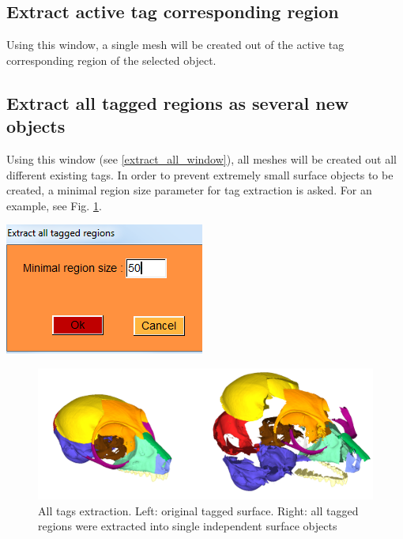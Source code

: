 \subsection{Extract active tag corresponding region}
Using this window, a single mesh will be created out of the active tag corresponding region of the
selected object. 

\subsection{Extract all tagged regions as several new objects}
\noindent
\begin{minipage}{0.5\textwidth}
Using this window (see \ref{extract_all_window}), all meshes will be created out all different existing tags. In order to prevent extremely small surface objects to be created, a minimal region size parameter for tag extraction is asked. For an example, see Fig. \ref{extract_all}.\end{minipage}    
\begin{minipage}{0.5\textwidth}\centering
  \includegraphics[scale=0.5]{images/Tags/Extract_all_tagged_regions.png}
\label{extract_all_window}

 \end{minipage} 
\noindent
\begin{figure}
  \centering
  \includegraphics[scale=0.25]{images/Tags/Extracted_tag2.png} 
	\caption{All tags extraction. Left: original tagged surface. Right: all tagged regions were extracted into single independent surface objects}
\label{extract_all}
 
\end{figure}

